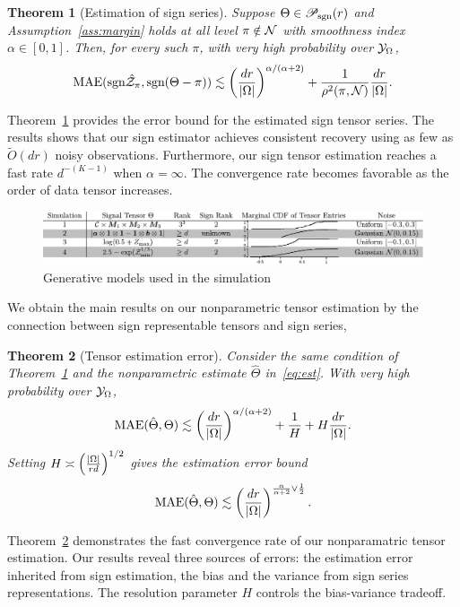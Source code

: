 \documentclass{article}
\theoremstyle{plain}
\newtheorem{thm}{Theorem}[section]
\theoremstyle{definition}
\def\sign{\textup{sgn}}
\def\caliP{\mathscr{P}_{\textup{sgn}}}
\begin{document}
 \begin{thm}[Estimation of sign series]\label{thm:classification} Suppose $\Theta\in\caliP(r)$ and Assumption~\ref{ass:margin} holds at all level $\pi\notin \mathcal{N}$ with smoothness index $\alpha\in[0,1]$. Then, for every such $\pi$, with very high probability over $\mathcal{Y}_\Omega$, 
\[
\textup{MAE}(\sign \hat \tZ_\pi, \sign(\Theta-\pi)) \lesssim  \left({d r \over |\Omega|}\right)^{\alpha/(\alpha+2)}+{1 \over \rho^2(\pi, \tN)} {dr \over |\Omega|}.
\]
\end{thm}
Theorem~\ref{thm:classification} provides the error bound for the estimated sign tensor series. The results shows that our sign estimator achieves consistent recovery using as few as $\tilde O(dr)$ noisy observations. Furthermore, our sign tensor estimation reaches a fast rate $d^{-(K-1)}$ when $\alpha=\infty$. The convergence rate becomes favorable as the order of data tensor increases. 

\begin{figure}[h]
\includegraphics[width=1\textwidth]{figure/simulation_comb.pdf}
\vspace{-1cm}
\caption{Generative models used in the simulation}
\end{figure}


We obtain the main results on our nonparametric tensor estimation by the connection between sign representable tensors and sign series,
\begin{thm}[Tensor estimation error]\label{thm:estimation} Consider the same condition of Theorem~\ref{thm:classification} and the nonparametric estimate $\hat \Theta$ in~\eqref{eq:est}. With very high probability over $\mathcal{Y}_\Omega$,
\[
\textup{MAE}(\hat \Theta, \Theta)\lesssim \left({d r \over |\Omega|}\right)^{\alpha/(\alpha+2)}+{1\over H}+H{d r \over |\Omega|}.
\]
Setting $H\asymp \left( |\Omega|\over rd\right)^{1/2}$ gives the estimation error bound
\[
\textup{MAE}(\hat \Theta, \Theta)\lesssim \left(dr \over|\Omega|\right)^{{\alpha \over \alpha+2} \vee {1\over 2}}.
\]
\end{thm}
Theorem~\ref{thm:estimation} demonstrates the fast convergence rate of our nonparamatric tensor estimation. Our results reveal three sources of errors: the estimation error inherited from sign estimation, the bias and the variance from sign series representations. The resolution parameter $H$ controls the bias-variance tradeoff.
\end{document}
